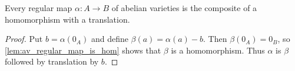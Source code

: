 \begin{corollary}
  \label{cor:av_regular_map_translation}
  Every regular map \(\alpha\colon A\to B\) of abelian varieties is the composite of
  a homomorphism with a translation.
\end{corollary}
\begin{proof}
  Put \(b=\alpha(0_A)\) and define \(\beta(a)=\alpha(a)-b\).  Then
  \(\beta(0_A)=0_B\), so \cref{lem:av_regular_map_is_hom} shows that \(\beta\) is a
  homomorphism.  Thus \(\alpha\) is \(\beta\) followed by translation by \(b\).
\end{proof}
